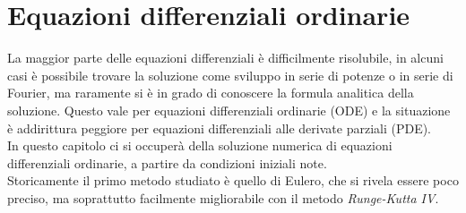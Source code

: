 \begin{center}
\begin{figure}[!h]


 \end{figure}
\end{center}
 
\chapter{Equazioni differenziali ordinarie}
La maggior parte delle equazioni differenziali è difficilmente risolubile, in alcuni casi è possibile trovare la soluzione come sviluppo in serie di potenze o
in serie di Fourier, ma raramente si è in grado di conoscere la formula analitica della soluzione. Questo vale per equazioni differenziali ordinarie (ODE)
e la situazione è addirittura peggiore per equazioni differenziali alle derivate parziali (PDE).\\
In questo capitolo ci si occuperà della soluzione numerica di equazioni differenziali ordinarie, a partire da condizioni iniziali note.\\
Storicamente il primo metodo studiato è quello di Eulero, che si rivela essere poco preciso, ma soprattutto facilmente migliorabile con 
il metodo \emph{ Runge-Kutta IV}.
